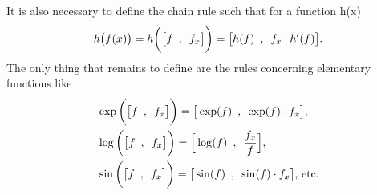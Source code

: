 It is also necessary to define the chain rule such that for a function h(x)
\begin{equation*}
h\big(f(x)\big) = h\bigg(\big[f \hspace{0.5em} , \hspace{0.5em} f_x\big]\bigg) = \big[h(f) \hspace{0.5em} , \hspace{0.5em}  f_x\cdot h'(f)\big]. 
\end{equation*}
The only thing that remains to define are the rules concerning elementary functions like
\begin{equation}
    \begin{aligned}
    &\exp\bigg(\big[f \hspace{0.5em} , \hspace{0.5em}  f_x\big]\bigg) =  \big[\exp(f) \hspace{0.5em} , \hspace{0.5em}  \exp(f)\cdot f_x\big],\\
    &\log\bigg(\big[f \hspace{0.5em} , \hspace{0.5em}  f_x\big]\bigg) =  \Big[\log(f) \hspace{0.5em} , \hspace{0.5em}  \frac{f_x}{f}\Big],\\
    &\sin\bigg(\big[f \hspace{0.5em} , \hspace{0.5em}  f_x\big]\bigg) =  \big[\sin(f) \hspace{0.5em} , \hspace{0.5em}  \sin(f)\cdot f_x\big]\text{,  etc.}\\
\end{aligned}
\label{eq:elementaryFunctions}
\end{equation}

